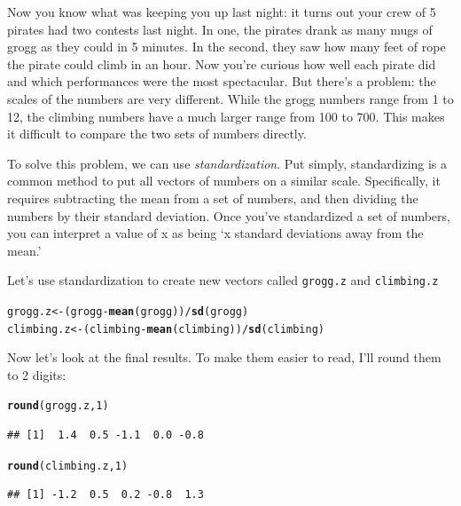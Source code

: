 \documentclass{tufte-book}\usepackage[]{graphicx}\usepackage[]{color}
\makeatletter
\newcommand{\hlnum}[1]{\textcolor[rgb]{0.686,0.059,0.569}{#1}}%
\newcommand{\hlopt}[1]{\textcolor[rgb]{0,0,0}{#1}}%
\newcommand{\hlstd}[1]{\textcolor[rgb]{0.345,0.345,0.345}{#1}}%
\newcommand{\hlkwb}[1]{\textcolor[rgb]{0.69,0.353,0.396}{#1}}%
\newcommand{\hlkwd}[1]{\textcolor[rgb]{0.737,0.353,0.396}{\textbf{#1}}}%
\newenvironment{kframe}{%
 \def\at@end@of@kframe{}%
 \ifinner\ifhmode%
  \def\at@end@of@kframe{\end{minipage}}%
  \begin{minipage}{\columnwidth}%
 \fi\fi%
 \def\FrameCommand##1{\hskip\@totalleftmargin \hskip-\fboxsep
 \colorbox{shadecolor}{##1}\hskip-\fboxsep
     \hskip-\linewidth \hskip-\@totalleftmargin \hskip\columnwidth}%
 \MakeFramed {\advance\hsize-\width
   \@totalleftmargin\z@ \linewidth\hsize
   \@setminipage}}%
 {\par\unskip\endMakeFramed%
 \at@end@of@kframe}
\newenvironment{knitrout}{}{} %
\makeatother
\begin{document}
Now you know what was keeping you up last night: it turns out your crew of 5 pirates had two contests last night. In one, the pirates drank as many mugs of grogg as they could in 5 minutes. In the second, they saw how many feet of rope the pirate could climb in an hour. Now you're curious how well each pirate did and which performances were the most spectacular. But there's a problem: the scales of the numbers are very different. While the grogg numbers range from 1 to 12, the climbing numbers have a much larger range from 100 to 700. This makes it difficult to compare the two sets of numbers directly.

To solve this problem, we can use \textit{standardization}. Put simply, standardizing is a common method to put all vectors of numbers on a similar scale. Specifically, it requires subtracting the mean from a set of numbers, and then dividing the numbers by their standard deviation. Once you've standardized a set of numbers, you can interpret a value of x as being `x standard deviations away from the mean.'

Let's use standardization to create new vectors called \texttt{grogg.z} and \texttt{climbing.z}

\begin{knitrout}
\color{fgcolor}\begin{kframe}
\begin{alltt}
\hlstd{grogg.z} \hlkwb{<-} \hlstd{(grogg} \hlopt{-} \hlkwd{mean}\hlstd{(grogg))} \hlopt{/} \hlkwd{sd}\hlstd{(grogg)}
\hlstd{climbing.z} \hlkwb{<-} \hlstd{(climbing} \hlopt{-} \hlkwd{mean}\hlstd{(climbing))} \hlopt{/} \hlkwd{sd}\hlstd{(climbing)}
\end{alltt}
\end{kframe}
\end{knitrout}

Now let's look at the final results. To make them easier to read, I'll round them to 2 digits:

\begin{knitrout}
\color{fgcolor}\begin{kframe}
\begin{alltt}
\hlkwd{round}\hlstd{(grogg.z,} \hlnum{1}\hlstd{)}
\end{alltt}
\begin{verbatim}
## [1]  1.4  0.5 -1.1  0.0 -0.8
\end{verbatim}
\begin{alltt}
\hlkwd{round}\hlstd{(climbing.z,} \hlnum{1}\hlstd{)}
\end{alltt}
\begin{verbatim}
## [1] -1.2  0.5  0.2 -0.8  1.3
\end{verbatim}
\end{kframe}
\end{knitrout}
\end{document}
